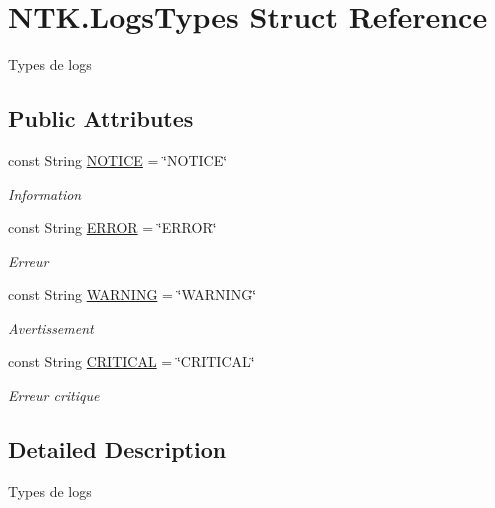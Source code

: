 \hypertarget{struct_n_t_k_1_1_logs_types}{}\section{N\+T\+K.\+Logs\+Types Struct Reference}
\label{struct_n_t_k_1_1_logs_types}


Types de logs  


\subsection*{Public Attributes}
\begin{DoxyCompactItemize}
\item 
const String \mbox{\hyperlink{struct_n_t_k_1_1_logs_types_a84af0b5f13ec7aa80a21658c5ae4d4fc}{N\+O\+T\+I\+CE}} = \char`\"{}N\+O\+T\+I\+CE\char`\"{}
\begin{DoxyCompactList}\small\item\em Information \end{DoxyCompactList}\item 
const String \mbox{\hyperlink{struct_n_t_k_1_1_logs_types_a4fcc098f0702262b70b62ebb05c71c44}{E\+R\+R\+OR}} = \char`\"{}E\+R\+R\+OR\char`\"{}
\begin{DoxyCompactList}\small\item\em Erreur \end{DoxyCompactList}\item 
const String \mbox{\hyperlink{struct_n_t_k_1_1_logs_types_a7800f659d99531ded46c623a3388f189}{W\+A\+R\+N\+I\+NG}} = \char`\"{}W\+A\+R\+N\+I\+NG\char`\"{}
\begin{DoxyCompactList}\small\item\em Avertissement \end{DoxyCompactList}\item 
const String \mbox{\hyperlink{struct_n_t_k_1_1_logs_types_a5b6c1eb0dc3ca51711a5764da55b3d87}{C\+R\+I\+T\+I\+C\+AL}} = \char`\"{}C\+R\+I\+T\+I\+C\+AL\char`\"{}
\begin{DoxyCompactList}\small\item\em Erreur critique \end{DoxyCompactList}\end{DoxyCompactItemize}


\subsection{Detailed Description}
Types de logs 



